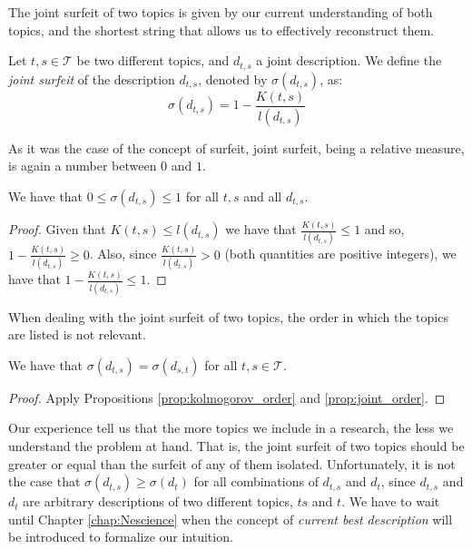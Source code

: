 The joint surfeit of two topics is given by our current understanding of both topics, and the shortest string that allows us to effectively reconstruct them.

\begin{definition}
Let $t,s \in \mathcal{T}$ be two different topics, and $d_{t,s}$ a joint description. We define the \emph{joint surfeit} of the description $d_{t,s}$, denoted by $\sigma(d_{t,s})$, as: 
\[
\sigma(d_{t,s}) = 1 - \frac{K(t, s)}{l \left( d_{t,s} \right)}
\]
\end{definition}

As it was the case of the concept of surfeit, joint surfeit, being a relative measure, is again a number between $0$ and $1$.

\begin{proposition}
We have that $0 \leq \sigma(d_{t,s}) \leq 1$ for all $t,s$ and all $d_{t,s}$.
\end{proposition}
\begin{proof}
Given that $K(t,s) \leq l(d_{t,s})$ we have that $\frac{K(t, s)}{l \left( d_{t,s} \right)} \leq 1$ and so, $1 - \frac{K(t, s)}{l \left( d_{t,s} \right)} \geq 0$. Also, since $\frac{K(t, s)}{l \left( d_{t,s} \right)} > 0$ (both quantities are positive integers), we have that $1 - \frac{K(t, s)}{l \left( d_{t,s} \right)} \leq 1$.
\end{proof}

When dealing with the joint surfeit of two topics, the order in which the topics are listed is not relevant.

\begin{proposition}
We have that $\sigma(d_{t,s}) = \sigma(d_{s,t})$ for all $t,s \in \mathcal{T}$.
\end{proposition}
\begin{proof}
Apply Propositions \ref{prop:kolmogorov_order} and \ref{prop:joint_order}.
\end{proof}

Our experience tell us that the more topics we include in a research, the less we understand the problem at hand. That is, the joint surfeit of two topics should be greater or equal than the surfeit of any of them isolated. Unfortunately, it is not the case that $\sigma(d_{t,s}) \geq \sigma(d_t)$ for all combinations of $d_{t,s}$ and $d_t$, since $d_{t,s}$ and $d_t$ are arbitrary descriptions of two different topics, $ts$ and $t$. We have to wait until Chapter \ref{chap:Nescience} when the concept of \emph{current best description} will be introduced to formalize our intuition.

